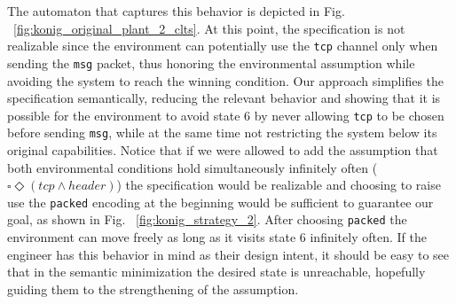The automaton that captures this behavior is depicted in Fig. ~\ref{fig:konig_original_plant_2_clts}. At this point, the specification is not realizable since the environment can potentially use the \texttt{tcp} channel only when sending the \texttt{msg} packet, thus honoring the environmental assumption while avoiding the system to reach the winning condition.
Our approach simplifies the specification semantically, reducing the relevant behavior and showing that it is possible for the environment to avoid state 6 by never allowing \texttt{tcp} to be chosen before sending \texttt{msg}, while at the same time not restricting the system below its original capabilities.
Notice that if we were allowed to add the assumption that both environmental conditions hold simultaneously infinitely often ($\square \Diamond (tcp \wedge header)$) the specification would be realizable and choosing to raise use the \texttt{packed} encoding at the beginning would be sufficient to guarantee our goal, as shown in Fig. ~\ref{fig:konig_strategy_2}. After choosing \texttt{packed} the environment can move freely as long as it visits state 6 infinitely often. If the engineer has this behavior in mind as their design intent, it should be easy to see that in the semantic minimization the desired state is unreachable, hopefully guiding them to the strengthening of the assumption. 


